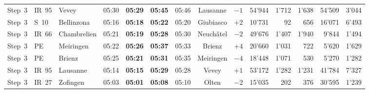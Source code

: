 \documentclass[preprint,12pt]{elsarticle}
\begin{document}
\begin{table}[!htb]
{\begin{tabular}{lllcccccrrrrrr}
Step~3 & IR~95 & Vevey & 05:30 & \textbf{05:29} & \textbf{05:45} & 05:46 & Lausanne & \(-1\) & 54'944 & 1'712 & 1'638 & 54'509 & 3'044 \\
Step~3 & S~10 & Bellinzona & 05:16 & \textbf{05:18} & \textbf{05:22} & 05:20 & Giubiasco & \(+2\) & 10'731 & 92 & 656 & 16'071 & 6'493 \\
Step~3 & IR~66 & Chambrelien & 05:21 & \textbf{05:19} & \textbf{05:28} & 05:30 & Neuchâtel & \(-2\) & 49'676 & 1'407 & 1'940 & 9'844 & 1'494 \\
Step~3 & PE & Meiringen & 05:22 & \textbf{05:26} & \textbf{05:37} & 05:33 & Brienz & \(+4\) & 20'660 & 1'031 & 722 & 5'620 & 1'629 \\
Step~3 & PE & Brienz & 05:25 & \textbf{05:21} & \textbf{05:31} & 05:35 & Meiringen & \(-4\) & 18'448 & 1'071 & 530 & 5'270 & 1'282 \\
Step~3 & IR~95 & Lausanne & 05:14 & \textbf{05:15} & \textbf{05:29} & 05:28 & Vevey & \(+1\) & 53'172 & 1'282 & 1'231 & 41'784 & 7'327 \\
Step~3 & IR~27 & Zofingen & 05:03 & \textbf{05:01} & \textbf{05:08} & 05:10 & Olten & \(-2\) & 15'035 & 202 & 376 & 30'595 & 1'239 \\
\bottomrule
\end{tabular}%
}
\end{table}
\end{document}
